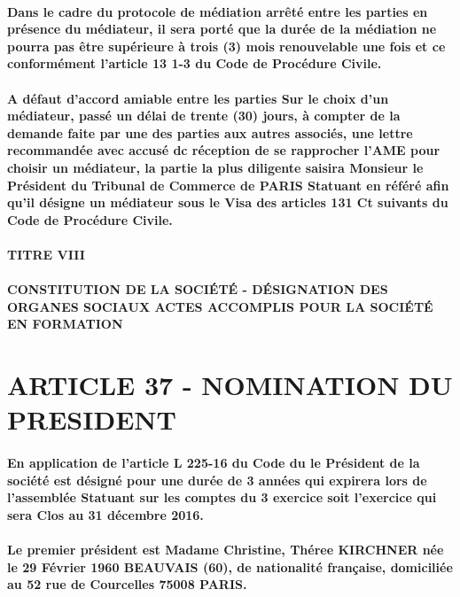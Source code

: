 \documentclass[a4paper, 11pt]{article}
\begin{document}
\paragraph{
  Dans le cadre du protocole de médiation arrêté entre les parties en présence du médiateur, il sera porté que la durée de la médiation ne pourra pas être supérieure à trois (3) mois renouvelable une fois et ce conformément l'article 13 1-3 du Code de Procédure Civile.
}

\paragraph{
  A défaut d'accord amiable entre les parties Sur le choix d'un médiateur, passé un délai de trente (30) jours, à compter de la demande faite par une des parties aux autres associés, une lettre recommandée avec accusé dc réception de se rapprocher l'AME pour choisir un médiateur, la partie la plus diligente saisira Monsieur le Président du Tribunal de Commerce de PARIS Statuant en référé afin qu'il désigne un médiateur sous le Visa des articles 131 Ct suivants du Code de Procédure Civile.
}

\paragraph{
  TITRE VIII\\
  \\
  CONSTITUTION DE LA SOCIÉTÉ - DÉSIGNATION DES ORGANES SOCIAUX ACTES ACCOMPLIS POUR LA SOCIÉTÉ EN FORMATION
}
\section*{ARTICLE 37 - NOMINATION DU PRESIDENT}

\paragraph{
  En application de l'article L 225-16 du Code du le Président de la société est désigné pour une durée de 3 années qui expirera lors de l'assemblée Statuant sur les comptes du 3 exercice soit l'exercice qui sera Clos au 31 décembre 2016.
}

\paragraph{
  Le premier président est Madame Christine, Théree KIRCHNER née le 29 Février 1960 BEAUVAIS (60), de nationalité française, domiciliée au 52 rue de Courcelles 75008 PARIS.
}
\end{document}
